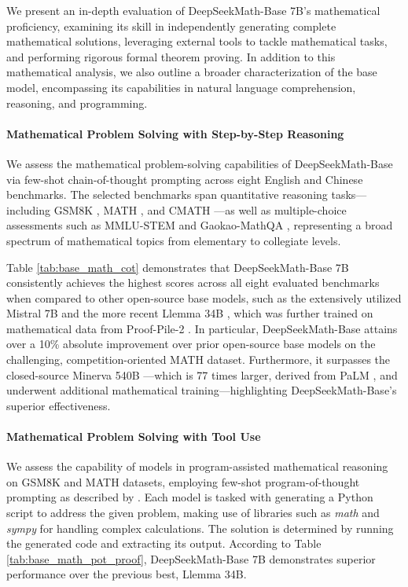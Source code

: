\begin{itemize}[topsep=0pt]
We present an in-depth evaluation of DeepSeekMath-Base 7B’s mathematical proficiency, examining its skill in independently generating complete mathematical solutions, leveraging external tools to tackle mathematical tasks, and performing rigorous formal theorem proving. In addition to this mathematical analysis, we also outline a broader characterization of the base model, encompassing its capabilities in natural language comprehension, reasoning, and programming.

\paragraph{Mathematical Problem Solving with Step-by-Step Reasoning}

We assess the mathematical problem-solving capabilities of DeepSeekMath-Base via few-shot chain-of-thought prompting \citep{cot} across eight English and Chinese benchmarks. The selected benchmarks span quantitative reasoning tasks—including GSM8K \citep{gsm8k}, MATH \citep{MATH}, and CMATH \citep{wei2023cmath}—as well as multiple-choice assessments such as MMLU-STEM \citep{mmlu} and Gaokao-MathQA \citep{agieval}, representing a broad spectrum of mathematical topics from elementary to collegiate levels.

Table \ref{tab:base_math_cot} demonstrates that DeepSeekMath-Base 7B consistently achieves the highest scores across all eight evaluated benchmarks when compared to other open-source base models, such as the extensively utilized Mistral 7B \citep{mistral} and the more recent Llemma 34B \citep{llemma}, which was further trained on mathematical data from Proof-Pile-2 \citep{llemma}. In particular, DeepSeekMath-Base attains over a 10\% absolute improvement over prior open-source base models on the challenging, competition-oriented MATH dataset. Furthermore, it surpasses the closed-source Minerva 540B \citep{minerva}—which is 77 times larger, derived from PaLM \citep{palm}, and underwent additional mathematical training—highlighting DeepSeekMath-Base's superior effectiveness.

\paragraph{Mathematical Problem Solving with Tool Use} We assess the capability of models in program-assisted mathematical reasoning on GSM8K and MATH datasets, employing few-shot program-of-thought prompting as described by \citep{pot,pal}. Each model is tasked with generating a Python script to address the given problem, making use of libraries such as \textit{math} and \textit{sympy} for handling complex calculations. The solution is determined by running the generated code and extracting its output. According to Table \ref{tab:base_math_pot_proof}, DeepSeekMath-Base 7B demonstrates superior performance over the previous best, Llemma 34B.


\end{itemize}
